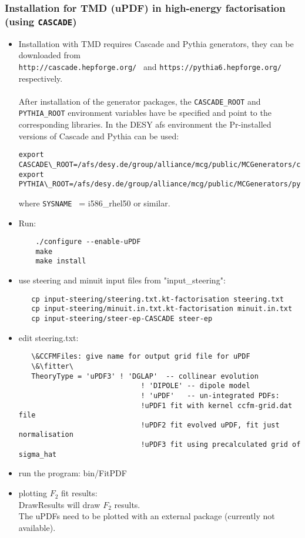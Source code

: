 \subsubsection{Installation for TMD (uPDF) in high-energy factorisation (using  {\tt CASCADE})}

\begin{itemize}

\item Installation with TMD requires Cascade and Pythia generators, 
they can be downloaded from\\
{\tt http://cascade.hepforge.org/ } and 
{\tt https://pythia6.hepforge.org/ } respectively. \\
        \\
After installation of the generator packages, the {\tt CASCADE\_ROOT}  and {\tt PYTHIA\_ROOT} 
environment variables have be specified and point to the corresponding libraries. 
In the DESY afs environment the Pr-installed versions of Cascade and Pythia can be used:  
%
{\footnotesize\begin{verbatim}
export CASCADE\_ROOT=/afs/desy.de/group/alliance/mcg/public/MCGenerators/cascade/2.2.04/\$SYSNAME 
export PYTHIA\_ROOT=/afs/desy.de/group/alliance/mcg/public/MCGenerators/pythia6/425/\$SYSNAME}
\end{verbatim} }
\normalsize
where {\tt SYSNAME } = i586\_rhel50 or similar.

\item Run:
\begin{verbatim}
    ./configure --enable-uPDF
    make 
    make install
\end{verbatim}


\item use steering and minuit input files from "input\_steering": 

   \begin{verbatim} 
   cp input-steering/steering.txt.kt-factorisation steering.txt 
   cp input-steering/minuit.in.txt.kt-factorisation minuit.in.txt 
   cp input-steering/steer-ep-CASCADE steer-ep 
   \end{verbatim}

\item  edit steering.txt: 
   \begin{verbatim}
   \&CCFMFiles: give name for output grid file for uPDF   
   \&\fitter\ 
   TheoryType = 'uPDF3' ! 'DGLAP'  -- collinear evolution
                             ! 'DIPOLE' -- dipole model 
                             ! 'uPDF'   -- un-integrated PDFs:
                             !uPDF1 fit with kernel ccfm-grid.dat file
                             !uPDF2 fit evolved uPDF, fit just normalisation
                             !uPDF3 fit using precalculated grid of sigma_hat
  \end{verbatim}

\item run the program: bin/FitPDF 
   
\item plotting $F_2$ fit results: \\
DrawResults  will draw $F_2$ results. \\
The uPDFs need to be plotted with an external package (currently not available).
\end{itemize}

